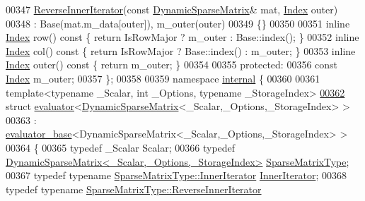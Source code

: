 \begin{DoxyCode}
00347     \hyperlink{class_eigen_1_1_dynamic_sparse_matrix_1_1_reverse_inner_iterator}{ReverseInnerIterator}(\textcolor{keyword}{const} \hyperlink{class_eigen_1_1_dynamic_sparse_matrix}{DynamicSparseMatrix}& mat, 
      \hyperlink{namespace_eigen_a62e77e0933482dafde8fe197d9a2cfde}{Index} outer)
00348       : Base(mat.m\_data[outer]), m\_outer(outer)
00349     \{\}
00350 
00351     \textcolor{keyword}{inline} \hyperlink{namespace_eigen_a62e77e0933482dafde8fe197d9a2cfde}{Index} row()\textcolor{keyword}{ const }\{ \textcolor{keywordflow}{return} IsRowMajor ? m\_outer : Base::index(); \}
00352     \textcolor{keyword}{inline} \hyperlink{namespace_eigen_a62e77e0933482dafde8fe197d9a2cfde}{Index} col()\textcolor{keyword}{ const }\{ \textcolor{keywordflow}{return} IsRowMajor ? Base::index() : m\_outer; \}
00353     \textcolor{keyword}{inline} \hyperlink{namespace_eigen_a62e77e0933482dafde8fe197d9a2cfde}{Index} outer()\textcolor{keyword}{ const }\{ \textcolor{keywordflow}{return} m\_outer; \}
00354 
00355   \textcolor{keyword}{protected}:
00356     \textcolor{keyword}{const} \hyperlink{namespace_eigen_a62e77e0933482dafde8fe197d9a2cfde}{Index} m\_outer;
00357 \};
00358 
00359 \textcolor{keyword}{namespace }\hyperlink{namespaceinternal}{internal} \{
00360 
00361 \textcolor{keyword}{template}<\textcolor{keyword}{typename} \_Scalar, \textcolor{keywordtype}{int} \_Options, \textcolor{keyword}{typename} \_StorageIndex>
\hyperlink{struct_eigen_1_1internal_1_1evaluator_3_01_dynamic_sparse_matrix_3_01___scalar_00_01___options_00_01___storage_index_01_4_01_4}{00362} \textcolor{keyword}{struct }\hyperlink{struct_eigen_1_1internal_1_1evaluator}{evaluator}<\hyperlink{class_eigen_1_1_dynamic_sparse_matrix}{DynamicSparseMatrix}<\_Scalar,\_Options,\_StorageIndex> >
00363   : \hyperlink{struct_eigen_1_1internal_1_1evaluator__base}{evaluator\_base}<DynamicSparseMatrix<\_Scalar,\_Options,\_StorageIndex> >
00364 \{
00365   \textcolor{keyword}{typedef} \_Scalar Scalar;
00366   \textcolor{keyword}{typedef} \hyperlink{class_eigen_1_1_dynamic_sparse_matrix}{DynamicSparseMatrix<\_Scalar,\_Options,\_StorageIndex>}
       \hyperlink{class_eigen_1_1_dynamic_sparse_matrix}{SparseMatrixType};
00367   \textcolor{keyword}{typedef} \textcolor{keyword}{typename} \hyperlink{class_eigen_1_1_dynamic_sparse_matrix_1_1_inner_iterator}{SparseMatrixType::InnerIterator} 
      \hyperlink{class_eigen_1_1_dynamic_sparse_matrix_1_1_inner_iterator}{InnerIterator};
00368   \textcolor{keyword}{typedef} \textcolor{keyword}{typename} \hyperlink{class_eigen_1_1_dynamic_sparse_matrix_1_1_reverse_inner_iterator}{SparseMatrixType::ReverseInnerIterator} 

\end{DoxyCode}
